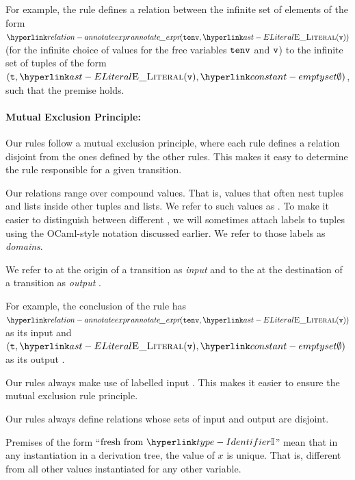 For example, the rule  defines a relation
between the infinite set of elements of the form
$\annotateexpr(\tenv, \ELiteral(\vv))$ (for the
infinite choice of values for the free variables $\texttt{tenv}$ and
$\texttt{v}$) to the infinite set of tuples of the form $(\vt,
\ELiteral(\vv), \emptyset)$, such that the premise holds.

\paragraph{Mutual Exclusion Principle:}
Our rules follow a mutual exclusion principle, where each rule
defines a relation disjoint from the ones defined by the other
rules. This makes it easy to determine the rule responsible
for a given transition.

\hypertarget{def-configuration}{}
Our relations range over compound values. That is, values that often nest tuples and lists inside other tuples and lists.
We refer to such values as \emph{\configurationsterm}. To make it easier to distinguish between different \configurationsterm{},
we will sometimes attach labels to tuples using the OCaml-style notation discussed earlier.
We refer to those labels as \emph{\configurationterm{} domains}.

We refer to \configurationsterm{} at the origin of a transition as \emph{input \configurationsterm{}} and to the
\configurationsterm{} at the destination of a transition as \emph{output \configurationsterm{}}.

For example, the conclusion of the rule  has \\
$\annotateexpr(\tenv, \ELiteral(\vv))$ as its input \configurationterm{}
and \\
$(\vt, \ELiteral(\vv), \emptyset)$ as its output \configurationterm{}.

Our rules always make use of labelled input \configurationsterm{}. This makes it easier to ensure
the mutual exclusion rule principle.

Our rules always define relations whose sets of input \configurationsterm{} and output \configurationsterm{} are disjoint.

\hypertarget{def-freshvariables}{}
\begin{definition}
  Premises of the form ``$\freshidentifier$'' mean that in any
  instantiation in a derivation tree, the value of $x$ is unique.
  That is, different from all other values instantiated for any other variable.
\end{definition}

